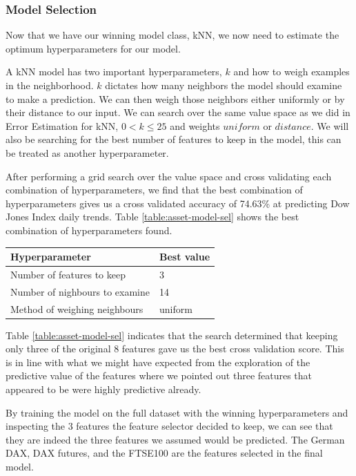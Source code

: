 \documentclass{report}
\begin{document}
\subsubsection{Model Selection}

Now that we have our winning model class, kNN, we now need to estimate the optimum hyperparameters for our model. 

A kNN model has two important hyperparameters, $k$ and how to weigh examples in the neighborhood. $k$ dictates how many neighbors the model should examine to make a prediction. We can then weigh those neighbors either uniformly or by their distance to our input. We can search over the same value space as we did in Error Estimation for kNN, $0 < k \leq 25$ and weights $uniform$ or $distance$. We will also be searching for the best number of features to keep in the model, this can be treated as another hyperparameter.

After performing a grid search over the value space and cross validating each combination of hyperparameters, we find that the best combination of hyperparameters gives us a cross validated accuracy of 74.63\% at predicting Dow Jones Index daily trends. Table \ref{table:asset-model-sel} shows the best combination of hyperparameters found.

\begin{center}
  
  \begin{tabular}{l | l}
	  Hyperparameter & Best value \\ \hline
	  Number of features to keep & 3 \\ \hline
	  Number of nighbours to examine & 14 \\ \hline
    Method of weighing neighbours & uniform
	  \label{table:asset-model-sel}
  \end{tabular}
\end{center}

Table \ref{table:asset-model-sel} indicates that the search determined that keeping only three of the original 8 features gave us the best cross validation score. This is in line with what we might have expected from the exploration of the predictive value of the features where we pointed out three features that appeared to be were highly predictive already.

By training the model on the full dataset with the winning hyperparameters and inspecting the 3 features the feature selector decided to keep, we can see that they are indeed the three features we assumed would be predicted. The German DAX, DAX futures, and the FTSE100 are the features selected in the final model.
\end{document}
